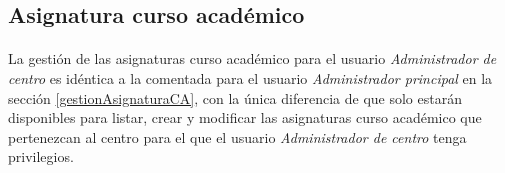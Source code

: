\subsection{Asignatura curso académico}

  \paragraph{}La gestión de las asignaturas curso académico para el usuario
  \textit{Administrador de centro} es idéntica a la comentada para el usuario
  \textit{Administrador principal} en la sección \ref{gestionAsignaturaCA}, con
  la única diferencia de que solo estarán disponibles para listar, crear y
  modificar las asignaturas curso académico que pertenezcan al centro para el
  que el usuario \textit{Administrador de centro} tenga privilegios.